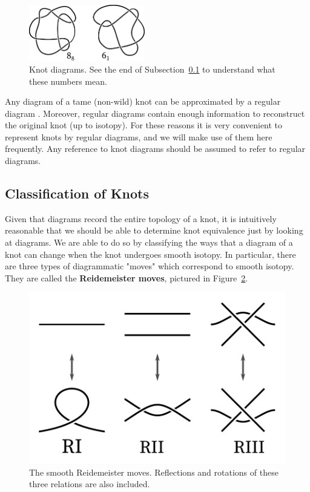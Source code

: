 \begin{figure}[ht]
    \centering
    \includegraphics[width=0.45\textwidth]{images/smooth-knots.pdf}
    \caption{Knot diagrams. See the end of Subsection~\ref{subsec:smooth-classification} to understand what these numbers mean.}
    \label{fig:diagrams}
\end{figure}

Any diagram of a tame (non-wild) knot can be approximated by a regular diagram \cite{murasugi1996}.
Moreover, regular diagrams contain enough information to reconstruct the original knot (up to isotopy). For these reasons it is very convenient to represent knots by regular diagrams, and we will make use of them here frequently. Any reference to knot diagrams should be assumed to refer to regular diagrams.

\subsection{Classification of Knots}\label{subsec:smooth-classification}

Given that diagrams record the entire topology of a knot, it is intuitively reasonable that we should be able to determine knot equivalence just by looking at diagrams. We are able to do so by classifying the ways that a diagram of a knot can change when the knot undergoes smooth isotopy. In particular, there are three types of diagrammatic "moves" which correspond to smooth isotopy. They are called the \textbf{Reidemeister moves}, pictured in Figure~\ref{fig:redemeister-smooth}.

\begin{figure}[ht!]
    \centering
    \includegraphics[width=0.45\linewidth]{images/smooth-redeimeister.pdf}
    \caption{The smooth Reidemeister moves. Reflections and rotations of these three relations are also included.}
    \label{fig:redemeister-smooth}
\end{figure}

